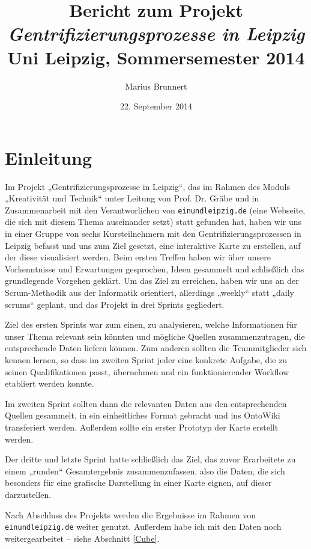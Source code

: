\documentclass[a4paper,11pt]{article}
\author{Marius Brunnert}
\title{{\Huge\bf Bericht zum Projekt\\[1em] \emph{Gentrifizierungsprozesse in
    Leipzig}}\\[2em] Uni Leipzig, Sommersemester 2014}
\date{22. September 2014}
\begin{document}
\begin{titlepage}
\maketitle
\end{titlepage}
\tableofcontents
\clearpage

\section{Einleitung}

Im Projekt „Gentrifizierungsprozesse in Leipzig“, das im Rahmen des Moduls
„Kreativität und Technik“ unter Leitung von Prof. Dr. Gräbe und in
Zusammenarbeit mit den Verantworlichen von \texttt{einundleipzig.de} (eine
Webseite, die sich mit diesem Thema auseinander setzt) statt gefunden hat,
haben wir uns in einer Gruppe von sechs Kursteilnehmern mit den
Gentrifizierungsprozessen in Leipzig befasst und uns zum Ziel gesetzt, eine
interaktive Karte zu erstellen, auf der diese visualisiert werden. Beim ersten
Treffen haben wir über unsere Vorkenntnisse und Erwartungen gesprochen, Ideen
gesammelt und schließlich das grundlegende Vorgehen geklärt. Um das Ziel zu
erreichen, haben wir uns an der Scrum-Methodik aus der Informatik orientiert,
allerdings „weekly“ statt „daily scrums“ geplant, und das Projekt in drei
Sprints gegliedert.

Ziel des ersten Sprints war zum einen, zu analysieren, welche Informationen
für unser Thema relevant sein könnten und mögliche Quellen zusammenzutragen,
die entsprechende Daten liefern können. Zum anderen sollten die Teammitglieder
sich kennen lernen, so dass im zweiten Sprint jeder eine konkrete Aufgabe, die
zu seinen Qualifikationen passt, übernehmen und ein funktionierender Workflow
etabliert werden konnte.

Im zweiten Sprint sollten dann die relevanten Daten aus den entsprechenden
Quellen gesammelt, in ein einheitliches Format gebracht und ins OntoWiki
transferiert werden. Außerdem sollte ein erster Prototyp der Karte erstellt
werden.

Der dritte und letzte Sprint hatte schließlich das Ziel, das zuvor Erarbeitete
zu einem „runden“ Gesamtergebnis zusammenzufassen, also die Daten, die sich
besonders für eine grafische Darstellung in einer Karte eignen, auf dieser
darzustellen.

Nach Abschluss des Projekts werden die Ergebnisse im Rahmen von
\texttt{einundleipzig.de} weiter genutzt. Außerdem habe ich mit den Daten noch
weitergearbeitet -- siehe Abschnitt \ref{Cube}.
\end{document}
